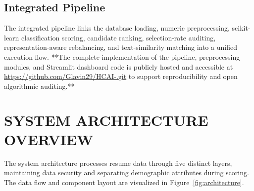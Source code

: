 \documentclass[sigconf]{acmart}
\begin{document}
\subsection{Integrated Pipeline}
The integrated pipeline links the database loading, numeric preprocessing, scikit-learn classification scoring, candidate ranking, selection-rate auditing, representation-aware rebalancing, and text-similarity matching into a unified execution flow. **The complete implementation of the pipeline, preprocessing modules, and Streamlit dashboard code is publicly hosted and accessible at \url{https://github.com/Glavin29/HCAI-.git} to support reproducibility and open algorithmic auditing.**

\section{SYSTEM ARCHITECTURE OVERVIEW}
The system architecture processes resume data through five distinct layers, maintaining data security and separating demographic attributes during scoring. The data flow and component layout are visualized in Figure~\ref{fig:architecture}.
\end{document}
